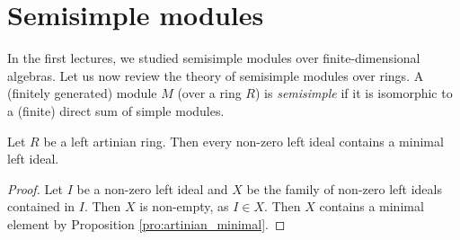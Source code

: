 \section{Semisimple modules}


In the first lectures, we studied semisimple modules over finite-dimensional 
algebras. Let us now review the theory of semisimple modules over rings. 
A (finitely generated) module $M$ (over a ring $R$) is \emph{semisimple} 
if it is isomorphic to a (finite) direct sum of simple modules. 

\begin{proposition}
    Let $R$ be a left artinian ring. 
    Then every non-zero left ideal contains a minimal left ideal. 
\end{proposition}

\begin{proof}
    Let $I$ be a non-zero left ideal and 
    $X$ be the family of non-zero left ideals contained in $I$. Then $X$ is non-empty, as 
    $I\in X$. Then $X$ contains a minimal element by Proposition \ref{pro:artinian_minimal}. 
\end{proof}



